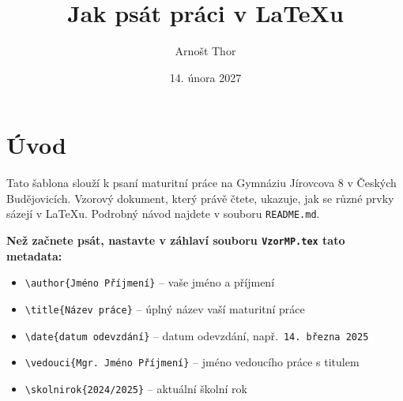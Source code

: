 \documentclass[12pt]{report}
\author{Arnošt Thor}                  %
\title{Jak psát práci v \LaTeX{}u}    %
\date{14. února 2027}                 %
\begin{document}
	\mytitlepage						%
	
	
	
	\podekovani{
		\lipsum[2]						%
	}
	
   {\tableofcontents\newpage}			%
	
\addtocounter{page}{1}		%
\chapter*{Úvod}     %

Tato šablona slouží k psaní maturitní práce na Gymnáziu Jírovcova 8 v Českých Budějovicích.
Vzorový dokument, který právě čtete, ukazuje, jak se různé prvky sázejí v \LaTeX{}u.
Podrobný návod najdete v souboru \texttt{README.md}.

\textbf{Než začnete psát, nastavte v záhlaví souboru \texttt{VzorMP.tex} tato metadata:}
\begin{itemize}
	\item \verb|\author{Jméno Příjmení}| \quad -- vaše jméno a příjmení
	\item \verb|\title{Název práce}| \quad -- úplný název vaší maturitní práce
	\item \verb|\date{datum odevzdání}| \quad -- datum odevzdání, např.~\texttt{14.~března~2025}
	\item \verb|\vedouci{Mgr. Jméno Příjmení}| \quad -- jméno vedoucího práce s titulem
	\item \verb|\skolnirok{2024/2025}| \quad -- aktuální školní rok
\end{itemize}
\end{document}
